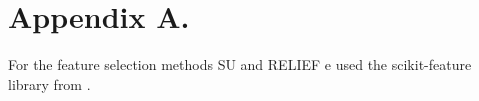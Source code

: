 \documentclass[twoside,11pt]{article}
\begin{document}


\newpage

\appendix
\section*{Appendix A.}
For the feature selection methods SU and RELIEF e used the scikit-feature library from \cite{Li-etal16}.
\label{app:some appendix}


\vskip 0.2in

\end{document}
